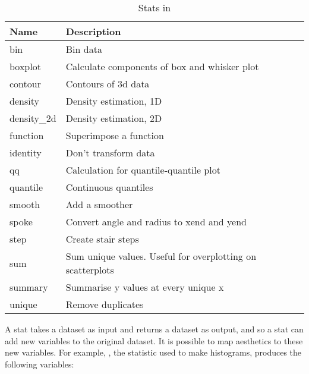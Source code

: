\begin{table}
  \begin{center}
  \begin{tabular}{lp{3in}}
    \toprule
    Name & Description \\
    \midrule
    bin          & Bin data                                                   \\
    boxplot      & Calculate components of box and whisker plot               \\
    contour      & Contours of 3d data                                        \\
    density      & Density estimation, 1D                                     \\
    density\_2d & Density estimation, 2D                                     \\
    function     & Superimpose a function                                     \\
    identity     & Don't transform data                                       \\
    qq           & Calculation for quantile-quantile plot                     \\
    quantile     & Continuous quantiles                                       \\
    smooth       & Add a smoother                                             \\
    spoke        & Convert angle and radius to xend and yend                  \\
    step         & Create stair steps                                         \\
    sum          & Sum unique values.  Useful for overplotting on scatterplots\\
    summary      & Summarise y values at every unique x                       \\
    unique       & Remove duplicates                                          \\
    \bottomrule
  \end{tabular}
  \end{center}
  \caption{Stats in \ggplot}
  \label{tbl:stats}
\end{table}

A stat takes a dataset as input and returns a dataset as output, and so a stat can add new variables to the original dataset.  It is possible to map aesthetics to these new variables.  For example, , the statistic used to make histograms, produces the following variables:

